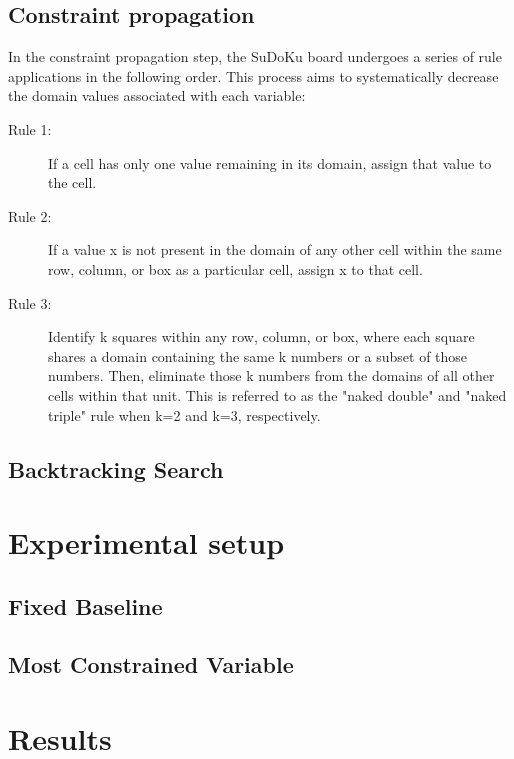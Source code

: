 \documentclass{article}
\begin{document}
\subsection{Constraint propagation}
In the constraint propagation step, the SuDoKu board undergoes a series of rule applications in the following order. This process aims to systematically decrease the domain values associated with each variable:
\begin{description}
  \item[Rule 1:] If a cell has only one value remaining in its domain, assign that value to the cell.
  \item[Rule 2:] If a value x is not present in the domain of any other cell within the same row, column, or box as a particular cell, assign x to that cell.
  \item[Rule 3:] Identify k squares within any row, column, or box, where each square shares a domain containing the same k numbers or a subset of those numbers. Then, eliminate those k numbers from the domains of all other cells within that unit. This is referred to as the "naked double" and "naked triple" rule when k=2 and k=3, respectively.
\end{description}


\label{alg:Constraint Propagation}
 
 
 
   
   
 
 

\subsection{Backtracking Search}
  
\label{alg:Backtracking Search}
 

\section{Experimental setup}
\subsection{Fixed  Baseline}

\subsection{Most Constrained Variable}

\section{Results}
\end{document}
